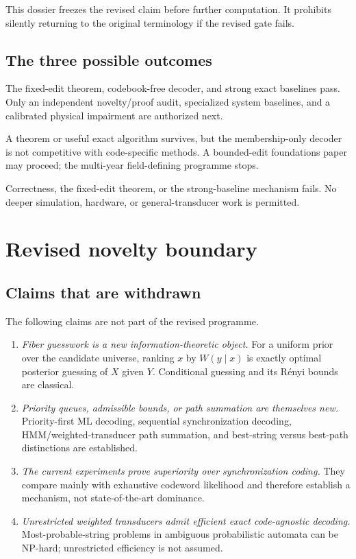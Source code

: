 \documentclass[11pt]{article}
\theoremstyle{definition}
\theoremstyle{remark}
\begin{document}
This dossier freezes the revised claim before further computation.  It prohibits silently returning to the original terminology if the revised gate fails.

\subsection{The three possible outcomes}
\begin{description}[leftmargin=2.3em,style=nextline]
\item[CONTINUE\_REVISED\_FIBER\_TRACK\_TO\_FINAL\_GATE]
The fixed-edit theorem, codebook-free decoder, and strong exact baselines pass.  Only an independent novelty/proof audit, specialized system baselines, and a calibrated physical impairment are authorized next.
\item[NARROW\_TO\_FIXED\_EDIT\_FOUNDATIONS\_STOP\_FIELD\_DEFINING]
A theorem or useful exact algorithm survives, but the membership-only decoder is not competitive with code-specific methods.  A bounded-edit foundations paper may proceed; the multi-year field-defining programme stops.
\item[STOP\_FIBER\_FIELD\_DEFINING\_PROGRAMME]
Correctness, the fixed-edit theorem, or the strong-baseline mechanism fails.  No deeper simulation, hardware, or general-transducer work is permitted.
\end{description}

\section{Revised novelty boundary}
\subsection{Claims that are withdrawn}
The following claims are not part of the revised programme.
\begin{enumerate}[leftmargin=2em]
\item \emph{Fiber guesswork is a new information-theoretic object.}  For a uniform prior over the candidate universe, ranking $x$ by $W(y\mid x)$ is exactly optimal posterior guessing of $X$ given $Y$.  Conditional guessing and its R\'enyi bounds are classical.
\item \emph{Priority queues, admissible bounds, or path summation are themselves new.}  Priority-first ML decoding, sequential synchronization decoding, HMM/weighted-transducer path summation, and best-string versus best-path distinctions are established.
\item \emph{The current experiments prove superiority over synchronization coding.}  They compare mainly with exhaustive codeword likelihood and therefore establish a mechanism, not state-of-the-art dominance.
\item \emph{Unrestricted weighted transducers admit efficient exact code-agnostic decoding.}  Most-probable-string problems in ambiguous probabilistic automata can be NP-hard; unrestricted efficiency is not assumed.
\end{enumerate}
\end{document}
